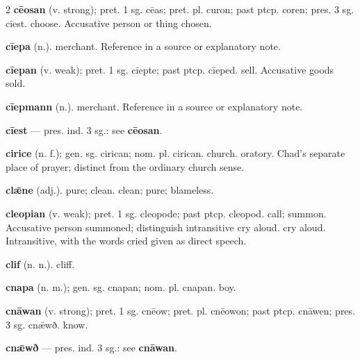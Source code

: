 \begin{multicols*}{2}
\textbf{cēosan} (v. strong); pret. 1 sg. cēas; pret. pl. curon; past ptcp. coren; pres. 3 sg. cīest. choose. Accusative person or thing chosen.\par
\textbf{cīepa} (n.). merchant. Reference in a source or explanatory note.\par
\textbf{cīepan} (v. weak); pret. 1 sg. cīepte; past ptcp. cīeped. sell. Accusative goods sold.\par
\textbf{cīepmann} (n.). merchant. Reference in a source or explanatory note.\par
\textbf{cīest} — pres. ind. 3 sg.: see \textbf{cēosan}.\par
\textbf{cirice} (n. f.); gen. sg. cirican; nom. pl. cirican. church. oratory. Chad's separate place of prayer; distinct from the ordinary church sense.\par
\textbf{clǣne} (adj.). pure; clean. clean; pure; blameless.\par
\textbf{cleopian} (v. weak); pret. 1 sg. cleopode; past ptcp. cleopod. call; summon. Accusative person summoned; distinguish intransitive cry aloud. cry aloud. Intransitive, with the words cried given as direct speech.\par
\textbf{clif} (n. n.). cliff.\par
\textbf{cnapa} (n. m.); gen. sg. cnapan; nom. pl. cnapan. boy.\par
\textbf{cnāwan} (v. strong); pret. 1 sg. cnēow; pret. pl. cnēowon; past ptcp. cnāwen; pres. 3 sg. cnǣwð. know.\par
\textbf{cnǣwð} — pres. ind. 3 sg.: see \textbf{cnāwan}.\par

\end{multicols*}
